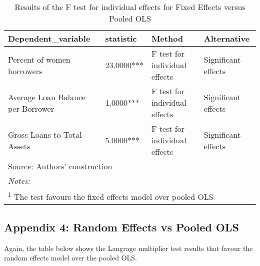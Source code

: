 \documentclass[a4paper,nobind]{templates/ociamthesis}
\begin{document}
\begin{table}

\caption{\label{tab:unnamed-chunk-35}Results of the F test for individual effects for Fixed Effects versus Pooled OLS}
\centering
\begin{tabular}[t]{llll}
\toprule
Dependent\_variable & statistic & Method & Alternative\\
\midrule
Percent of women borrowers & 23.0000*** & F test for individual effects & Significant effects\\
Average Loan Balance per Borrower & 1.0000*** & F test for individual effects & Significant effects\\
Gross Loans to Total Assets & 5.0000*** & F test for individual effects & Significant effects\\
\bottomrule
\multicolumn{4}{l}{\rule{0pt}{1em}Source: Authors' construction}\\
\multicolumn{4}{l}{\rule{0pt}{1em}\textit{Notes: }}\\
\multicolumn{4}{l}{\rule{0pt}{1em}\textsuperscript{1} The test favours the fixed effects model over pooled OLS}\\
\end{tabular}
\end{table}

\newpage

\hypertarget{appendix-4-random-effects-vs-pooled-ols}{%
\subsection{Appendix 4: Random Effects vs Pooled OLS}\label{appendix-4-random-effects-vs-pooled-ols}}

Again, the table below shows the Langrage multiplier test results that favour the random effects model over the pooled OLS.
\end{document}
